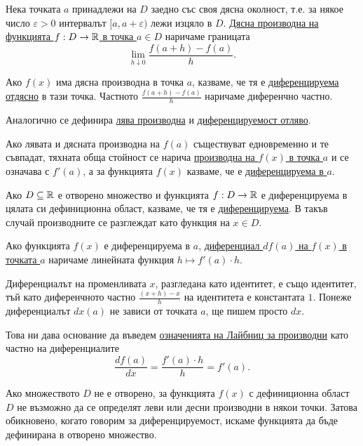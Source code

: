 \documentclass[numbers=endperiod, DIV=15, bibliography=totocnumbered]{scrartcl}
\begin{document}
\begin{definition}
  Нека точката $a$ принадлежи на $D$ заедно със своя дясна околност, т.е. за някое число $\varepsilon > 0$ интервалът $[a, a + \varepsilon)$ лежи изцяло в $D$. \uline{Дясна производна на функцията $f: D \to \mathbb{R}$ в точка $a \in D$} наричаме границата
  \begin{displaymath}
    \lim_{h \downarrow 0} \frac {f(a + h) - f(a)} h.
  \end{displaymath}

  Ако $f(x)$ има дясна производна в точка $a$, казваме, че тя е \uline{диференцируема отдясно} в тази точка.
  Частното $\frac {f(a + h) - f(a)} h$ наричаме диференчно частно.

  Аналогично се дефинира \uline{лява производна} и \uline{диференцируемост отляво}.

  Ако лявата и дясната производна на $f(a)$ съществуват едновременно и те съвпадат, тяхната обща стойност се нарича \uline{производна на $f(x)$ в точка $a$} и се означава с $f'(a)$, а за функцията $f(x)$ казваме, че е \uline{диференцируема в $a$}.

  Ако $D \subseteq \mathbb{R}$ е отворено множество и функцията $f: D \to \mathbb{R}$ е диференцируема в цялата си дефиниционна област, казваме, че тя е \uline{диференцируема}. В такъв случай производните се разглеждат като функция на $x \in D$.

  Ако функцията $f(x)$ е диференцируема в $a$, \uline{диференциал $df(a)$ на $f(x)$ в точката $a$} наричаме линейната функция $h \mapsto f'(a) \cdot h$.

  Диференциалът на променливата $x$, разгледана като идентитет, е също идентитет, тъй като диференчното частно $\frac {(x + h) - x} h$ на идентитета е константата $1$. Понеже диференциалът $dx(a)$ не зависи от точката $a$, ще пишем просто $dx$.

  Това ни дава основание да въведем \uline{означенията на Лайбниц за производни} като частно на диференциалите
  \begin{displaymath}
    \frac {df(a)} {dx} = \frac {f'(a) \cdot h} h = f'(a).
  \end{displaymath}
\end{definition}

\begin{note}
  Ако множеството $D$ не е отворено, за функцията $f(x)$ с дефиниционна област $D$ не възможно да се определят леви или десни производни в някои точки. Затова обикновено, когато говорим за диференцируемост, искаме функцията да бъде дефинирана в отворено множество.
\end{note}
\end{document}
